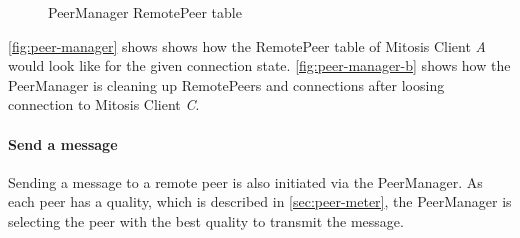 \begin{figure}[htb!]
  \centering
    \hspace{1 cm}
	\caption{PeerManager RemotePeer table}
\label{fig:peer-manager}
\end{figure}

\vref{fig:peer-manager} shows shows how the RemotePeer table of Mitosis Client \textit{A} would look like for the given connection state. \vref{fig:peer-manager-b} shows how the PeerManager is cleaning up RemotePeers and connections after loosing connection to Mitosis Client \textit{C}. 

\paragraph{Send a message}
Sending a message to a remote peer is also initiated via the PeerManager. As each peer has a quality, which is described in \vref{sec:peer-meter}, the PeerManager is selecting the peer with the best quality to transmit the message.